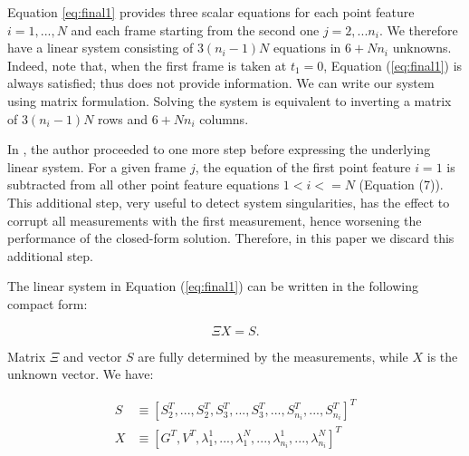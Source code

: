 \documentclass[letterpaper, 10 pt, journal, final]{ieeeconf}  %
\begin{document}
Equation \ref{eq:final1} provides three scalar equations for each point feature $i=1,...,N$ and each frame starting from the second one $j=2,...n_i$.
We therefore have a linear system consisting of $3(n_i-1)N$ equations in $6 + Nn_i$ unknowns.
Indeed, note that, when the first frame is taken at $t_1 = 0$,
Equation (\ref{eq:final1}) is always satisfied; thus does not provide information.
We can write our system using matrix formulation.
Solving the system is equivalent to inverting a matrix of $3(n_i-1)N$ rows and $6+Nn_i$ columns.

In \cite{Martinelli2014}, the author proceeded to one more step before expressing the underlying linear system.
For a given frame $j$, the equation of the first point feature $i=1$ is subtracted from all other point feature equations $1<i<=N$ (Equation (7)).
This additional step, very useful to detect system singularities, has the effect to corrupt all measurements with the first measurement,
hence worsening the performance of the closed-form solution. Therefore,
in this paper we discard this additional step.

The linear system in Equation (\ref{eq:final1}) can be written in the following compact form:

\begin{equation}
\label{eq:mat1}
\Xi X = S.
\end{equation}

\noindent Matrix $\Xi$ and vector $S$ are fully determined by the measurements, while $X$ is the unknown vector.
We have:

\begin{equation*}
  \begin{aligned}
S &\equiv [S_2^T, ...,S_2^T, S_3^T,...,S_3^T,...,S_{n_i}^T,...,S_{n_i}^T]^T \\
X &\equiv [ G^T, V^T, \lambda_1^1, ..., \lambda_1^N, ..., \lambda_{n_i}^1, ..., \lambda_{n_i}^N]^T
  \end{aligned}
\end{equation*}
\vspace{-1cm}
\end{document}
